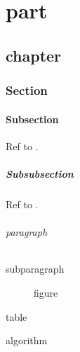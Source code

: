 \documentclass[english]{book}
\theoremstyle{plain}
\theoremstyle{plain}
\theoremstyle{plain}
\theoremstyle{plain}
\theoremstyle{plain}
\theoremstyle{plain}
\theoremstyle{definition}
\theoremstyle{definition}
\theoremstyle{definition}
\theoremstyle{definition}
\theoremstyle{remark}
\theoremstyle{remark}
\begin{document}
\part{part\label{part:part}}



\chapter{chapter\label{chap:chapter}}



\section{Section\label{sec:Section}}



\subsection{Subsection\label{sub:subsection}}

Ref to .


\subsubsection{Subsubsection\label{sub:Subsubsection}}

Ref to .


\paragraph{paragraph\label{par:paragraph}}



\subparagraph{subparagraph\label{par:subparagraph}}


\begin{figure}
\protect\caption{\label{Sta:figure}figure}
\end{figure}



\begin{table}
\protect\caption{\label{Sta:table}table}
\end{table}



\begin{algorithm}
\protect\caption{algorithm\label{Sta:algorithm}}
\end{algorithm}
\end{document}
